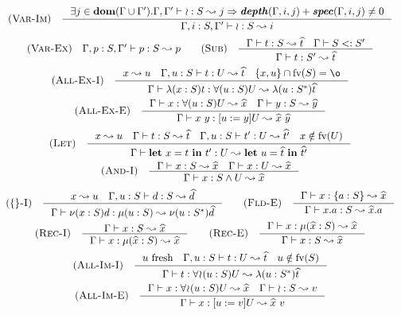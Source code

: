 \[\begin{array}{c}
    \RULE{Var-Im} \quad \inference{
        \exists j \in \DOM{\Gamma \cup \Gamma'} .
            \TJ{\Gamma, \Gamma'}{\IMP}{S}{j} \Rightarrow
            \DEPTH{\Gamma, i, j} + \SPEC{\Gamma, i, j} \neq 0
    }{
        \TJ{\Gamma, i: S, \Gamma'}{\IMP}{S}{i}
    } \\[4mm]

    \RULE{Var-Ex} \quad \TJ{\Gamma, p: S, \Gamma'}{p}{S}{p} \qquad

    \RULE{Sub} \quad \inference{
        \TJ{\Gamma}{t}{S}{\HAT{t}} \quad
        \SJ{\Gamma}{S}{S'}
    }{
        \TJ{\Gamma}{t}{S'}{\HAT{t}}
    } \\[4mm]

    \RULE{All-Ex-I} \quad \inference{
        x \leadsto u \quad
        \TJ{\Gamma, u: S}{t}{U}{\HAT{t}} \quad
        \{x, u\} \cap \FV{S} = \o
    }{
        \TJ{\Gamma}{\ABS{x}{S}{t}}{\DFUN{u}{S}{U}}{\ABS{u}{\TRANS{S}}{\HAT{t}}}
    } \\[4mm]

    \RULE{All-Ex-E} \quad \inference{
        \TJ{\Gamma}{x}{\DFUN{u}{S}{U}}{\HAT{x}} \quad
        \TJ{\Gamma}{y}{S}{\HAT{y}}
    }{
        \TJ{\Gamma}{x\ y}{\SUB{u}{y}U}{\HAT{x}\ \HAT{y}}
    } \\[4mm]

    \RULE{Let} \quad \inference{
        x \leadsto u \quad
        \TJ{\Gamma}{t}{S}{\HAT{t}} \quad
        \TJ{\Gamma, u: S}{t'}{U}{\HAT{t'}} \quad
        x \notin \FV{U}
    }{
        \TJ{\Gamma}{\LET{x}{t}{t'}}{U}{\LET{u}{\HAT{t}}{\HAT{t'}}}
    } \\[4mm]

    \RULE{And-I} \quad \inference{
        \TJ{\Gamma}{x}{S}{\HAT{x}} \quad
        \TJ{\Gamma}{x}{U}{\HAT{x}}
    }{
        \TJ{\Gamma}{x}{\AGG{S}{U}}{\HAT{x}}
    } \\[4mm]

    \RULE{\{\}-I} \quad \inference{
        x \leadsto u \quad
        \TJ{\Gamma, u: S}{d}{S}{\HAT{d}}
    }{
        \TJ{\Gamma}{\OBJ{x}{S}{d}}{\REC{u}{S}}{\OBJ{u}{\TRANS{S}}{\HAT{d}}}
    } \qquad

    \RULE{Fld-E} \quad \inference{
        \TJ{\Gamma}{x}{\FDEC{a}{S}}{\HAT{x}}
    }{
        \TJ{\Gamma}{x.a}{S}{\HAT{x}.a}
    } \\[4mm]

    \RULE{Rec-I} \quad \inference{
        \TJ{\Gamma}{x}{S}{\HAT{x}}
    }{
        \TJ{\Gamma}{x}{\REC{\HAT{x}}{S}}{\HAT{x}}
    } \qquad

    \RULE{Rec-E} \quad \inference{
        \TJ{\Gamma}{x}{\REC{\HAT{x}}{S}}{\HAT{x}}
    }{
        \TJ{\Gamma}{x}{S}{\HAT{x}}
    } \\[4mm]

    \RULE{All-Im-I} \quad \inference{
        u\ \text{fresh} \quad
        \TJ{\Gamma, u: S}{t}{U}{\HAT{t}} \quad
        u \notin \FV{S}
    }{
        \TJ{\Gamma}{t}{\IFUN{u}{S}{U}}{\ABS{u}{\TRANS{S}}{\HAT{t}}}
    } \\[4mm]

    \RULE{All-Im-E} \quad \inference{
        \TJ{\Gamma}{x}{\IFUN{u}{S}{U}}{\HAT{x}} \quad
        \TJ{\Gamma}{\IMP}{S}{v}
    }{
        \TJ{\Gamma}{x}{\SUB{u}{v}U}{\HAT{x}\ v}
    }
\end{array}\]

